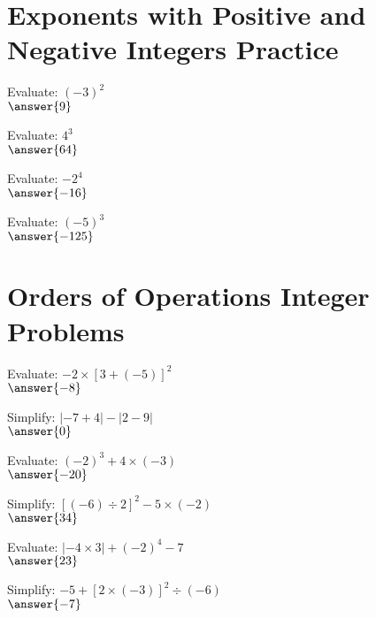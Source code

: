 \documentclass{ximera}
\begin{document}


\section*{Exponents with Positive and Negative Integers Practice}

\begin{problem}
Evaluate: $(-3)^2$\\
$\answer{9}$
\end{problem}

\begin{problem}
Evaluate: $4^3$\\
$\answer{64}$
\end{problem}

\begin{problem}
Evaluate: $-2^4$\\
$\answer{-16}$
\end{problem}

\begin{problem}
Evaluate: $(-5)^3$\\
$\answer{-125}$
\end{problem}



\section*{Orders of Operations Integer Problems}

\begin{problem}
Evaluate: $-2 \times [3 + (-5)]^2$\\
$\answer{-8}$
\end{problem}

\begin{problem}
Simplify: $| -7 + 4 | - | 2 - 9 |$\\
$\answer{0}$
\end{problem}

\begin{problem}
Evaluate: $(-2)^3 + 4 \times (-3)$\\
$\answer{-20}$
\end{problem}

\begin{problem}
Simplify: $[(-6) \div 2]^2 - 5 \times (-2)$\\
$\answer{34}$
\end{problem}

\begin{problem}
Evaluate: $| -4 \times 3 | + (-2)^4 - 7$\\
$\answer{23}$
\end{problem}

\begin{problem}
Simplify: $-5 + [2 \times (-3)]^2 \div (-6)$\\
$\answer{-7}$
\end{problem}

\end{document}
